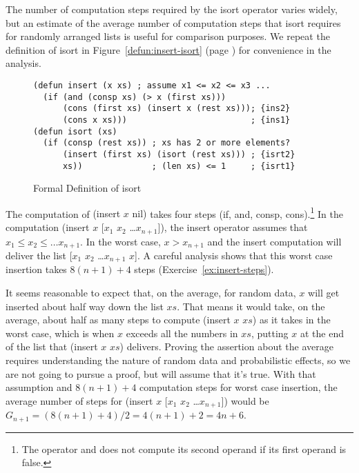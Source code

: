 The number of computation steps required by the
\textsf{isort} operator
varies widely, but
an estimate of the average number of computation steps that
\textsf{isort} requires for randomly arranged lists
is useful for comparison purposes.
We repeat the definition of \textsf{isort}
in Figure~\ref{defun:insert-isort} (page \pageref{defun:insert-isort})
for convenience in the analysis.

\begin{figure}
\begin{code}
\begin{verbatim}
(defun insert (x xs) ; assume x1 <= x2 <= x3 ...
  (if (and (consp xs) (> x (first xs)))
      (cons (first xs) (insert x (rest xs))); {ins2}
      (cons x xs)))                         ; {ins1}
(defun isort (xs)
  (if (consp (rest xs)) ; xs has 2 or more elements?
      (insert (first xs) (isort (rest xs))) ; {isrt2}
      xs))              ; (len xs) <= 1     ; {isrt1}
\end{verbatim}
\end{code}
\caption{Formal Definition of \textsf{isort}}
\label{defun:insert-isort}\label{defun:isort-copy}
\end{figure}

The computation of \textsf{(insert $x$ nil)}
takes four steps
(\textsf{if}, \textsf{and}, \textsf{consp},
\textsf{cons}).\footnote{The operator \textsf{and}
does not compute its second operand if its first operand
is false.}
In the computation \textsf{(insert $x$ [$x_1$ $x_2$ \dots $x_{n+1}$])},
the \textsf{insert} operator assumes that
$x_1 \leq x_2 \leq \dots x_{n+1}$.
In the worst case, $x > x_{n+1}$ and the \textsf{insert} computation
will deliver the list [$x_1$ $x_2$ \dots $x_{n+1}$ $x$].
A careful analysis shows that this worst case insertion takes
$8(n+1)+4$ steps (Exercise~\ref{ex:insert-steps}).

It seems reasonable to expect that, on the average,
for random data, $x$ will get inserted about
half way down the list $xs$.
That means it would take, on the average, about
half as many steps to compute \textsf{(insert $x$ $xs$)}
as it takes in the worst case,
which is when $x$ exceeds all the numbers
in $xs$, putting $x$ at the end of the
list that \textsf{(insert $x$ $xs$)} delivers.
Proving the assertion about the average
requires understanding the nature of random
data and probabilistic effects, so we are not going
to pursue a proof, but will assume that it's true.
With that assumption and $8(n+1)+4$
computation steps for worst case insertion,
the average number of steps
for \textsf{(insert $x$ [$x_1$ $x_2$ \dots $x_{n+1}$])} would be
$G_{n+1} = (8(n+1)+4)/2 = 4(n+1)+2 = 4n+6$.

